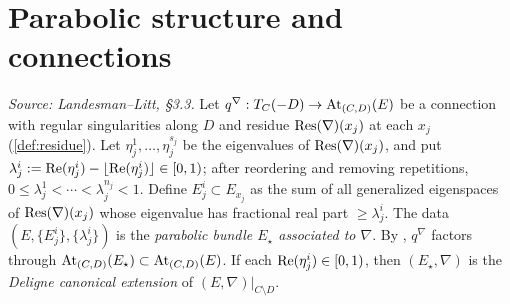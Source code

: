 \section{Parabolic structure and connections}
\label{sec:deformation-associated-parabolic}

\begin{definition}
  \label{def:associated-parabolic}
  \textit{Source: Landesman--Litt, \S3.3.}
  Let $q^\nabla: T_C(-D) \to \operatorname{At}_{(C,D)}(E)$ be a connection with regular
  singularities along $D$ and residue $\operatorname{Res}(\nabla)(x_j)$ at each $x_j$
  (\cref{def:residue}). Let $\eta^1_j,\dots,\eta^{s_j}_j$ be the eigenvalues of
  $\operatorname{Res}(\nabla)(x_j)$, and put
  $\lambda^i_j := \operatorname{Re}(\eta^i_j) - \lfloor \operatorname{Re}(\eta^i_j)\rfloor \in [0,1)$;
  after reordering and removing repetitions,
  $0 \le \lambda^1_j < \cdots < \lambda^{n_j}_j < 1$. Define
  $E^i_j \subset E_{x_j}$ as the sum of all generalized eigenspaces of
  $\operatorname{Res}(\nabla)(x_j)$ whose eigenvalue has fractional real part
  $\ge \lambda^i_j$. The data $(E,\{E^i_j\},\{\lambda^i_j\})$ is the
  \emph{parabolic bundle $E_\star$ associated to $\nabla$}. By
  \cite[Lemma 4.1]{BHH:parabolic}, $q^\nabla$ factors through
  $\operatorname{At}_{(C,D)}(E_\star) \subset \operatorname{At}_{(C,D)}(E)$. If each
  $\operatorname{Re}(\eta^i_j) \in [0,1)$, then $(E_\star,\nabla)$ is the
  \emph{Deligne canonical extension} of $(E,\nabla)|_{C \setminus D}$.
\end{definition}

